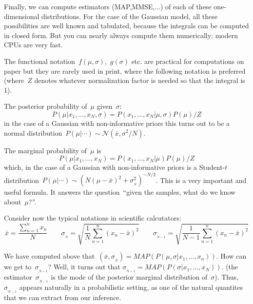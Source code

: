 Finally, we can compute estimators (MAP,MMSE,$\ldots$) of each of these
one-dimensional distributions.
For the case of the Gaussian model, all these possibilities are well known
and tabulated, because the integrals can be computed in closed form.  But you
can nearly always compute them numerically: modern CPUs are very fast.

The functional notation~$f(\mu,\sigma)$,~$g(\sigma)$ etc. are practical for
computations on paper but they are rarely used in print, where the following
notation is preferred (where~$Z$ denotes whatever normalization factor is
needed so that the integral is 1).

The posterior probability of~$\mu$ given~$\sigma$:
$$
P(\mu|x_1,\ldots,x_N,\sigma)=P(x_1,\ldots,x_N|\mu,\sigma)P(\mu)/Z
$$
in the case of a Gaussian with non-informative priors this turns out to be a
normal
distribution~$P(\mu|\cdots)\sim\mathcal{N}\left(\bar{x},\sigma^2/N\right)$.

The marginal probability of~$\mu$ is
$$
P(\mu|x_1,\ldots,x_N)=P(x_1,\ldots,x_N|\mu)P(\mu)/Z
$$
which, in the case of a Gaussian with non-informative priors is a Student-$t$
distribution~$P(\mu|\cdots)\sim\left(N(\mu-\bar
x)^2+\sigma_{{}_N}^2\right)^{-N/2}$.
This is a very important and useful formula.  It answers the question~``given
the samples, what do we know about~$\mu$?''.

Consider now the typical notations in scientific calcutators:
$$
\bar x=\frac{\sum_{n=1}^nx_n}{N}
\qquad
\sigma_{{}_N}=\sqrt{\frac{1}{N}\sum_{n=1}^n(x_n-\bar x)^2}
\qquad
\sigma_{{}_{N-1}}=\sqrt{\frac{1}{N-1}\sum_{n=1}^n(x_n-\bar x)^2}
$$

We have computed above that~$(\bar
x,\sigma_{{}_N})=MAP(P(\mu,\sigma|x_1,\ldots,x_n))$.
How can we get to~$\sigma_{{}_{N-1}}$?  Well, it turns out that
$
\sigma_{{}_{N-1}}=MAP(P(\sigma|x_1,\ldots,x_N)).
$
(the estimator~$\sigma_{{}_{N-1}}$ is the mode of the posterior marginal
distribution of~$\sigma$).  Thus, $\sigma_{{}_{N-1}}$ appears naturally in a
probabilistic setting, as one of the natural quantites that we can extract
from our inference.

